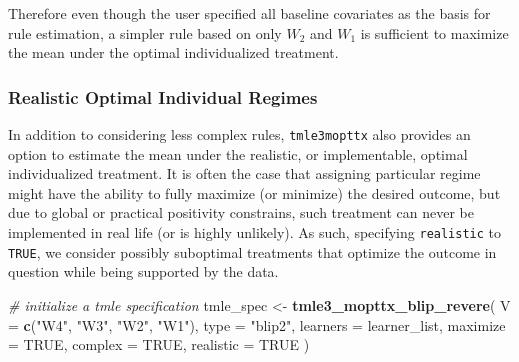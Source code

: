 \documentclass[12pt, krantz2,]{krantz}
\newenvironment{Shaded}{\begin{snugshade}}{\end{snugshade}}
\newcommand{\CommentTok}[1]{\textcolor[rgb]{0.37,0.37,0.37}{\textit{#1}}}
\newcommand{\DataTypeTok}[1]{\textcolor[rgb]{0.27,0.27,0.27}{#1}}
\newcommand{\KeywordTok}[1]{\textcolor[rgb]{0.27,0.27,0.27}{\textbf{#1}}}
\newcommand{\NormalTok}[1]{#1}
\newcommand{\OperatorTok}[1]{\textcolor[rgb]{0.43,0.43,0.43}{\textbf{#1}}}
\newcommand{\OtherTok}[1]{\textcolor[rgb]{0.37,0.37,0.37}{#1}}
\newcommand{\StringTok}[1]{\textcolor[rgb]{0.5,0.5,0.5}{#1}}
\theoremstyle{definition}
\theoremstyle{definition}
\theoremstyle{definition}
\newcommand{\1}{\mathbbm{1}}
\begin{document}
Therefore even though the user specified all baseline covariates as the basis
for rule estimation, a simpler rule based on only \(W_2\) and \(W_1\) is sufficient
to maximize the mean under the optimal individualized treatment.

\hypertarget{realistic-optimal-individual-regimes}{%
\subsubsection{Realistic Optimal Individual Regimes}\label{realistic-optimal-individual-regimes}}

In addition to considering less complex rules, \texttt{tmle3mopttx} also provides an
option to estimate the mean under the realistic, or implementable, optimal
individualized treatment. It is often the case that assigning particular regime
might have the ability to fully maximize (or minimize) the desired outcome, but
due to global or practical positivity constrains, such treatment can never be
implemented in real life (or is highly unlikely). As such, specifying
\texttt{realistic} to \texttt{TRUE}, we consider possibly suboptimal treatments that optimize
the outcome in question while being supported by the data.

\begin{Shaded}
\begin{Highlighting}[]
\CommentTok{# initialize a tmle specification}
\NormalTok{tmle_spec <-}\StringTok{ }\KeywordTok{tmle3_mopttx_blip_revere}\NormalTok{(}
  \DataTypeTok{V =} \KeywordTok{c}\NormalTok{(}\StringTok{"W4"}\NormalTok{, }\StringTok{"W3"}\NormalTok{, }\StringTok{"W2"}\NormalTok{, }\StringTok{"W1"}\NormalTok{), }\DataTypeTok{type =} \StringTok{"blip2"}\NormalTok{,}
  \DataTypeTok{learners =}\NormalTok{ learner_list,}
  \DataTypeTok{maximize =} \OtherTok{TRUE}\NormalTok{, }\DataTypeTok{complex =} \OtherTok{TRUE}\NormalTok{, }\DataTypeTok{realistic =} \OtherTok{TRUE}
\NormalTok{)}
\end{Highlighting}
\end{Shaded}

\begin{Shaded}
\end{Shaded}
\end{document}
